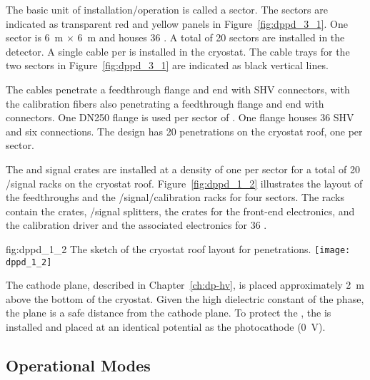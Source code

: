 The basic unit of installation/operation is called a sector. The sectors are indicated as transparent red and yellow panels in Figure~\ref{fig:dppd_3_1}. One \dual {} sector is \SI{6}{\m} $\times$ \SI{6}{\m} and houses \num{36} . A total of \num{20} sectors are installed in the detector. A single  cable per  is installed in the cryostat.
The cable trays for the two sectors in Figure~\ref{fig:dppd_3_1} are indicated as black vertical lines.


The  cables penetrate a feedthrough flange and end with SHV connectors, with the calibration fibers also penetrating a feedthrough flange and end with  connectors. One DN250 flange is used per sector of \dual {}. One flange houses \num{36} SHV and six  connections. The \dual {} design has \num{20} penetrations on the cryostat roof, one per sector. 

The  and signal crates are installed at a density of one per sector for a total of \num{20} /signal racks on the cryostat roof. Figure~\ref{fig:dppd_1_2} illustrates the layout of the feedthroughs and the /signal/calibration racks for four sectors. The racks contain the  crates, /signal splitters, the  crates for the front-end electronics, and the calibration  driver and the associated electronics for \num{36} .

\begin{dunefigure}{fig:dppd_1_2}
{The sketch of the cryostat roof layout for \dual {} penetrations.}
\texttt{[image: dppd\_1\_2]}
\end{dunefigure}

The cathode plane, described in Chapter~\ref{ch:dp-hv}, is placed approximately \SI{2}{m} above the bottom of the cryostat. Given the high dielectric constant of the  phase, the  plane is a safe distance from the cathode plane. To protect the , the  is installed and placed at an identical potential as the  photocathode (\SI{0}{V}).

\subsection{Operational Modes} %
\label{sec:dp-pds-oveerview_operation}

